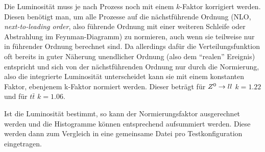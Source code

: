 Die Luminosität muss je nach Prozess noch mit einem $k$-Faktor korrigiert
werden. Diesen benötigt man, um alle Prozesse auf die nächstführende Ordnung
(NLO, \emph{next-to-leading order}, also führende Ordnung mit einer weiteren
Schleife oder Abstrahlung im Feynman-Diagramm) zu normieren, auch wenn sie
teilweise nur in führender Ordnung berechnet sind. Da allerdings dafür die
Verteilungsfunktion oft bereits in guter Näherung unendlicher Ordnung (also dem
"`realen"' Ereignis) entspricht und sich von der nächstführenden Ordnung nur
durch die Normierung, also die integrierte Luminosität unterscheidet kann sie
mit einem konstanten Faktor, ebenjenem k-Faktor normiert werden. Dieser beträgt
für $Z^0\to ll$ $k = 1.22$ und für $t\bar{t}$ $k=1.06$.\cite{10tev}

Ist die Luminosität bestimmt, so kann der Normierungsfaktor ausgerechnet werden
und die Histogramme können entsprechend aufsummiert werden. Diese werden dann
zum Vergleich in eine gemeinsame Datei pro Testkonfiguration eingetragen.
